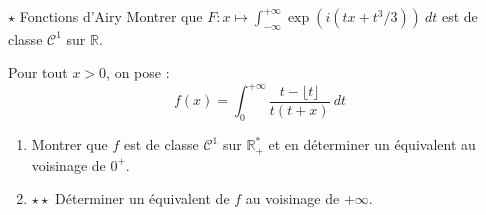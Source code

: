 \documentclass[french,a4paper]{article}
\newcommand{\R}{\mathbb{R}}
\newcommand{\st}{^*}
\theoremstyle{plain}
\theoremstyle{definition}
\theoremstyle{remark}
\begin{document}
\begin{ex}[Moulin.IP.28]{$\star$ Fonctions d'Airy}
	Montrer que $F:x\mapsto\displaystyle\int_{-\infty}^{+\infty}\exp\left(i(tx+t^3/3)\right)\ dt$ est de classe $\mathcal{C}^1$ sur $\R$.
\end{ex}

\begin{ex}[Moulin.IP.29]{}
	Pour tout $x>0$, on pose : $$f(x)=\int_{0}^{+\infty}\frac{t-\lfloor t\rfloor}{t(t+x)}\ dt$$
	\begin{enumerate}
		\item Montrer que $f$ est de classe $\mathcal{C}^1$ sur $\R_+\st$ et en déterminer un équivalent au voisinage de $0^+$.
		\item $\star\star$ Déterminer un équivalent de $f$ au voisinage de $+\infty$.
	\end{enumerate}
\end{ex}
\end{document}
